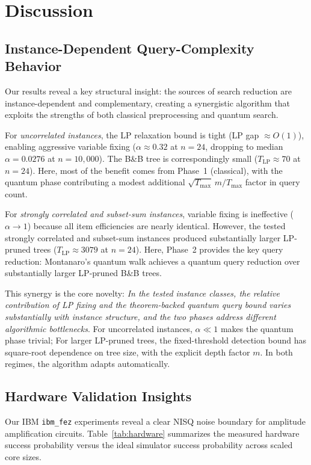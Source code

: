 \documentclass[conference]{IEEEtran} \IEEEoverridecommandlockouts
\begin{document}
\section{Discussion}

\subsection{Instance-Dependent Query-Complexity Behavior}

Our results reveal a key structural insight: the sources of search reduction are instance-dependent and complementary, creating a synergistic algorithm that exploits the strengths of both classical preprocessing and quantum search.

For \textit{uncorrelated instances}, the LP relaxation bound is tight (LP gap $\approx O(1)$), enabling aggressive variable fixing ($\alpha \approx 0.32$ at $n = 24$, dropping to median $\alpha = 0.0276$ at $n = 10{,}000$). The B\&B tree is correspondingly small ($T_{\text{LP}} \approx 70$ at $n=24$). Here, most of the benefit comes from Phase~1 (classical), with the quantum phase contributing a modest additional $\sqrt{T_{\max}}\,m / T_{\max}$ factor in query count.

For \textit{strongly correlated and subset-sum instances}, variable fixing is ineffective ($\alpha \to 1$) because all item efficiencies are nearly identical. However, the tested strongly correlated and subset-sum instances produced substantially larger LP-pruned trees ($T_{\text{LP}} \approx 3079$ at $n=24$). Here, Phase~2 provides the key query reduction: Montanaro's quantum walk achieves a quantum query reduction over substantially larger LP-pruned B\&B trees.

This synergy is the core novelty: \textit{In the tested instance classes, the relative contribution of LP fixing and the theorem-backed quantum query bound varies substantially with instance structure, and the two phases address different algorithmic bottlenecks}. For uncorrelated instances, $\alpha \ll 1$ makes the quantum phase trivial; For larger LP-pruned trees, the fixed-threshold detection bound has square-root dependence on tree size, with the explicit depth factor $m$. In both regimes, the algorithm adapts automatically.

\subsection{Hardware Validation Insights}

Our IBM \texttt{ibm\_fez} experiments reveal a clear NISQ noise boundary for amplitude amplification circuits. Table~\ref{tab:hardware} summarizes the measured hardware success probability versus the ideal simulator success probability across scaled core sizes.
\end{document}
